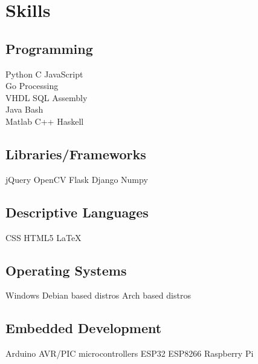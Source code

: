 \documentclass[]{plushcv}
\begin{document}
\begin{minipage}[t]{0.3\textwidth}


  \section{Skills}
  \subsection{Programming}
  \sectionsep
  Python \textbullet{} C \textbullet{} JavaScript  \\ Go \textbullet{} Processing \\
  \sectionsep
  VHDL \textbullet{} SQL \textbullet{} Assembly \\ Java \textbullet{} Bash \\
  \sectionsep
  Matlab \textbullet{} C++ \textbullet{} Haskell \\
  \sectionsep
  \sectionsep
  \subsection{Libraries/Frameworks}
  \sectionsep
  jQuery \textbullet{} OpenCV \textbullet{} Flask \textbullet{} Django \textbullet{} Numpy \\
  \sectionsep
  \sectionsep
  \subsection{Descriptive Languages}
  \sectionsep
  CSS \textbullet{} HTML5 \textbullet{} \LaTeX
  \sectionsep
  \subsection{Operating Systems}
  \sectionsep
  Windows \textbullet{} Debian based distros \textbullet{} Arch based distros \\
  \sectionsep
  \sectionsep
  \subsection{Embedded Development}
  \sectionsep
  Arduino \textbullet{} AVR/PIC microcontrollers \textbullet{} ESP32 \textbullet{} ESP8266 \textbullet{} Raspberry Pi \\

\end{minipage}
\end{document}
